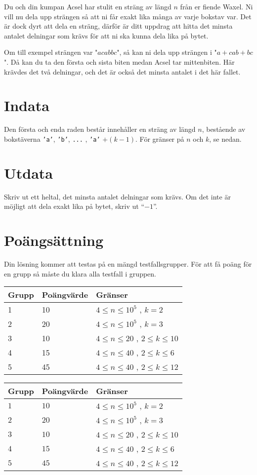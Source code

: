 Du och din kumpan Acsel har stulit en sträng av längd $n$ från er fiende Waxel. Ni vill nu dela upp strängen så att ni får
exakt lika många av varje bokstav var. Det är dock dyrt att dela en sträng, därför är ditt uppdrag att hitta det minsta antalet delningar som krävs för att ni ska kunna dela lika på bytet.

Om till exempel strängen var "$\textit{acabbc}$", så kan ni dela upp strängen i
"$\textit{a}+\textit{cab}+\textit{bc}$". Då kan du ta den första och sista biten medan Acsel tar mittenbiten. Här krävdes det två delningar,
och det är också det minsta antalet i det här fallet.

\section*{Indata}
Den första och enda raden består innehåller en sträng av längd $n$, bestående av bokstäverna \texttt{'a'}, \texttt{'b'}, \texttt{...} , \texttt{'a'} $+(k-1)$. För gränser på $n$ och $k$, se nedan.

\section*{Utdata}
Skriv ut ett heltal, det minsta antalet delningar som krävs. Om det inte är möjligt att dela exakt lika på bytet, skriv ut  ``$-1$''.

\section*{Poängsättning}
Din lösning kommer att testas på en mängd testfallsgrupper.
För att få poäng för en grupp så måste du klara alla testfall i gruppen.

\noindent
\begin{tabular}{| l | l | l |}
\hline
Grupp & Poängvärde & Gränser \\ \hline
1     & 10         &  $4 \le n \le 10^5$ , $k = 2$ \\ \hline
2     & 20         &  $4 \le n \le 10^5$ , $k = 3$ \\ \hline
3     & 10         &  $4 \le n \le 20$ , $2 \leq k \leq 10$ \\ \hline
4     & 15         &  $4 \le n \le 40$ , $2 \leq k \leq 6$ \\ \hline
5     & 45         &  $4 \le n \le 40$ , $2 \leq k \leq 12$ \\ \hline
\end{tabular}

\noindent
\begin{tabular}{| l | l | p{12cm} |}
  \hline
  Grupp & Poängvärde & Gränser \\ \hline
  $1$   & $10$       & $4 \le n \le 10^5$ , $k = 2$ \\ \hline
  $2$   & $20$       & $4 \le n \le 10^5$ , $k = 3$ \\ \hline
  $3$   & $10$       & $4 \le n \le 20$ , $2 \leq k \leq 10$ \\ \hline
  $4$   & $15$       & $4 \le n \le 40$ , $2 \leq k \leq 6$ \\ \hline
  $5$   & $45$       & $4 \le n \le 40$ , $2 \leq k \leq 12$ \\ \hline
\end{tabular}